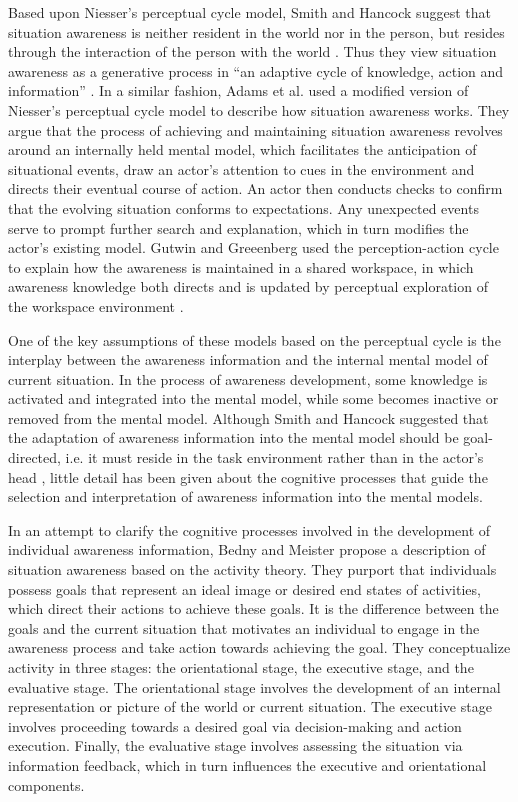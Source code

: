 Based upon Niesser's perceptual cycle model, Smith and Hancock suggest that situation awareness is neither resident in the world nor in the person, but resides through the interaction of the person with the world \cite{Smith1995}. Thus they view situation awareness as a generative process in ``an adaptive cycle of knowledge, action and information'' \cite{Smith1995}. In a similar fashion, Adams et al. \cite{Adams1995} used a modified version of Niesser's perceptual cycle model to describe how situation awareness works. They argue that the process of achieving and maintaining situation awareness revolves around an internally held mental model, which facilitates the anticipation of situational events, draw an actor's attention to cues in the environment and directs their eventual course of action. An actor then conducts checks to confirm that the evolving situation conforms to expectations. Any unexpected events serve to prompt further search and explanation, which in turn modifies the actor's existing model. Gutwin and Greeenberg used the perception-action cycle to explain how the awareness is maintained in a shared workspace, in which awareness knowledge both directs and is updated by perceptual exploration of the workspace environment \cite{Gutwin2002}.

One of the key assumptions of these models based on the perceptual cycle is the interplay between the awareness information and the internal mental model of current situation. In the process of awareness development, some knowledge is activated and integrated into the mental model, while some becomes inactive or removed from the mental model. Although Smith and Hancock suggested that the adaptation of awareness information into the mental model should be goal-directed, i.e. it must reside in the task environment rather than in the actor's head \cite{Smith1995}, little detail has been given about the cognitive processes that guide the selection and interpretation of awareness information into the mental models.

In an attempt to clarify the cognitive processes involved in the development of individual awareness information, Bedny and Meister \cite{Bedny1999} propose a description of situation awareness based on the activity theory. They purport that individuals possess goals that represent an ideal image or desired end states of activities, which direct their actions to achieve these goals. It is the difference between the goals and the current situation that motivates an individual to engage in the awareness process and take action towards achieving the goal. They conceptualize activity in three stages: the orientational stage, the executive stage, and the evaluative stage. The orientational stage involves the development of an internal representation or picture of the world or current situation. The executive stage involves proceeding towards a desired goal via decision-making and action execution. Finally, the evaluative stage involves assessing the situation via information feedback, which in turn influences the executive and orientational components.

